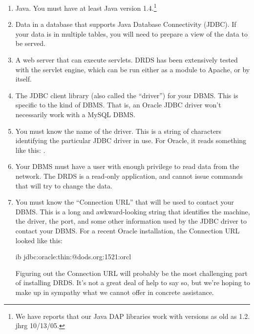 \documentclass{dods-book}
\begin{document}

\begin{enumerate}
\item Java.  You must have at least Java version 1.4.\footnote{We have
    reports that our Java DAP libraries work with versions as old as
    1.2. jhrg 10/13/05.}
\item Data in a database that supports Java Database Connectivity
  (JDBC).  If your data is in multiple tables, you will need to
  prepare a view of the data to be served.
\item A web server that can execute servlets.  DRDS has been
  extensively tested with the
   servlet engine, which can
  be run either as a module to Apache, or by itself.
\item The JDBC client library (also called the ``driver'') for your
  DBMS.  This is specific to the kind of DBMS.  That is, an Oracle
  JDBC driver won't necessarily work with a MySQL DBMS.
\item You must know the name of the driver.  This is a string of
  characters identifying the particular JDBC driver in use.  For
  Oracle, it reads something like this: .
\item Your DBMS must have a user with enough privilege to read data
  from the network.  The DRDS is a read-only application, and cannot
  issue commands that will try to change the data.
\item You must know the ``Connection URL'' that will be used to
  contact your DBMS.  This is a long and awkward-looking string that
  identifies the machine, the driver, the port, and some other
  information used by the JDBC driver to contact your DBMS.  For a
  recent Oracle installation, the Connection URL looked like this:

\begin{vcode}{ib}
jdbc:oracle:thin:@dods.org:1521:orcl    
\end{vcode}

  Figuring out the Connection URL will probably be the most
  challenging part of installing DRDS.  It's not a great deal of help
  to say so, but we're hoping to make up in sympathy what we cannot
  offer in concrete assistance.

\end{enumerate}
\end{document}

